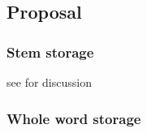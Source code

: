 \subsection{Proposal}

\subsubsection{Stem storage}

\citet{Boye2010}
\citet{Maiden2010}
\citet{Baronian2005}

see \citet{Embick2005} for discussion

\subsubsection{Whole word storage}

\citet{Mithun2010}
\citet{Gorman2011e}

